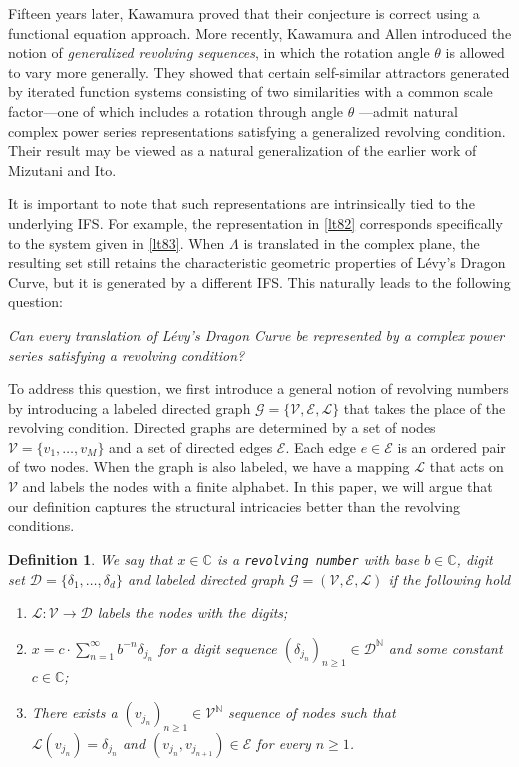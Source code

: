 \documentclass[12pt, a4paper]{amsart}
\newtheorem{definition}[theorem]{Definition}
\numberwithin{equation}{section}
\numberwithin{theorem}{section}
\begin{document}
Fifteen years later, Kawamura \cite{Kawamura-2002} proved that their conjecture is correct using a functional equation approach. More recently, Kawamura and Allen \cite{Kawamura-Allen-2021} introduced the notion of {\it generalized revolving sequences}, in which the rotation angle $\theta$ is allowed to vary more generally. They showed that certain self-similar attractors generated by iterated function systems consisting of two similarities with a common scale factor---one of which includes a rotation through angle $\theta$ ---admit natural complex power series representations satisfying a generalized revolving condition. Their result may be viewed as a natural generalization of the earlier work of Mizutani and Ito.

It is important to note that such representations are intrinsically tied to the underlying IFS. For example, the representation in \eqref{lt82} corresponds specifically to the system given in \eqref{lt83}. When $\Lambda$ is translated in the complex plane, the resulting set still retains the characteristic geometric properties of L\'evy’s Dragon Curve, but it is generated by a different IFS. This naturally leads to the following question:
\medskip

\textit{Can every translation of L\'evy’s Dragon Curve be represented by a complex power series satisfying a revolving condition?}

\medskip
To address this question, we first introduce a general notion of revolving numbers by introducing a labeled directed graph $\mathcal{G}=\{\mathcal{V},\mathcal{E},\mathcal{L}\}$ that takes the place of the revolving condition.
Directed graphs are determined by a set of nodes $\mathcal{V}=\{v_1,\dots, v_M\}$ and a set of directed edges $\mathcal{E}$. Each edge $e\in\mathcal{E}$ is an ordered pair of two nodes. When the graph is also labeled, we have a mapping $\mathcal{L}$ that acts on $\mathcal{V}$ and labels the nodes with a finite alphabet.
In this paper, we will argue that our definition captures the structural intricacies better than the revolving conditions.
\begin{definition}
  We say that $x\in\mathbb{C}$ is a \texttt{revolving number} with base $b\in\mathbb{C}$, digit set $\mathcal{D}=\{\delta_1,\dots,\delta_d\}$ and labeled directed graph $\mathcal{G}=(\mathcal{V},\mathcal{E}, \mathcal{L})$ if the following hold
  \begin{enumerate}
    \item $\mathcal{L}:\mathcal{V}\to\mathcal{D}$ labels the nodes with the digits;
    \item $x=c\cdot\sum_{n=1}^{\infty} b^{-n}\delta_{j_n}$ for a digit sequence $(\delta_{j_n})_{n\geq 1}\in\mathcal{D}^{\mathbb{N}}$ and some constant $c\in\mathbb{C}$;
    \item There exists a $(v_{j_n})_{n\geq 1}\in\mathcal{V}^{\mathbb{N}}$ sequence of nodes such that \\ $\mathcal{L}(v_{j_n})=\delta_{j_n}$ and $(v_{j_n},v_{j_{n+1}})\in\mathcal{E}$ for every $n\geq 1$.
  \end{enumerate}
 
\end{definition}
\end{document}

